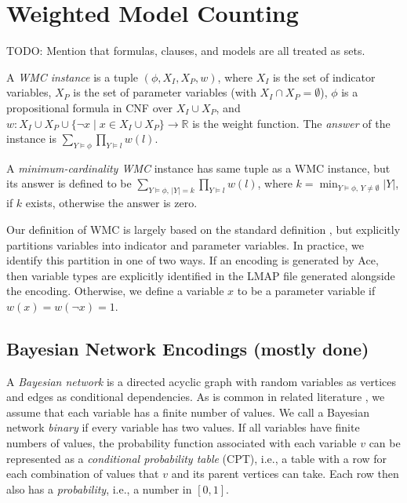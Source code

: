 \documentclass[runningheads]{llncs}
\begin{document}
\section{Weighted Model Counting}

TODO: Mention that formulas, clauses, and models are all treated as sets.

\begin{definition}[WMC]
  A \emph{WMC instance} is a tuple $(\phi, X_I, X_P, w)$, where $X_I$ is
  the set of indicator variables, $X_P$ is the set of parameter variables (with
  $X_I \cap X_P = \emptyset$), $\phi$ is a propositional formula in CNF over
  $X_I \cup X_P$, and $w\colon X_I \cup X_P \cup \{\neg x \mid x \in X_I \cup
  X_P\} \to \mathbb{R}$ is the weight function. The \emph{answer} of the
  instance is $\sum_{Y \models \phi} \prod_{Y \models l} w(l)$.
\end{definition}

\begin{definition}
  A \emph{minimum-cardinality WMC} instance has same tuple as a WMC instance,
  but its answer is defined to be $\sum_{Y \models \phi\text{, }|Y| = k}
  \prod_{Y \models l} w(l)$, where $k = \min_{Y \models \phi\text{, }Y \ne
    \emptyset} |Y|$, if $k$ exists, otherwise the answer is zero.
\end{definition}

Our definition of WMC is largely based on the standard definition
\cite{DBLP:journals/ai/ChaviraD08}, but explicitly partitions variables into
indicator and parameter variables. In practice, we identify this partition in
one of two ways. If an encoding is generated by \textsf{Ace}, then variable
types are explicitly identified in the LMAP file generated alongside the
encoding. Otherwise, we define a variable $x$ to be a parameter variable if
$w(x) = w(\neg x) = 1$.

\subsection{Bayesian Network Encodings (mostly done)}

A \emph{Bayesian network} is a directed acyclic graph with random variables as
vertices and edges as conditional dependencies. As is common in related
literature
\cite{DBLP:conf/kr/Darwiche02,DBLP:conf/aaai/SangBK05}, we assume that each
variable has a finite number of values. We call a Bayesian network \emph{binary}
if every variable has two values. If all variables have finite numbers of
values, the probability function associated with each variable $v$ can be
represented as a \emph{conditional probability table} (CPT), i.e., a table
with a row for each combination of values that $v$ and its parent vertices can
take. Each row then also has a \emph{probability}, i.e., a number in $[0, 1]$.
\end{document}
